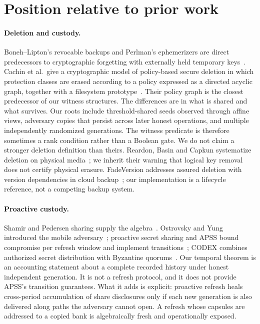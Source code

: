 \documentclass[pdflatex,sn-mathphys-num]{sn-jnl}
\theoremstyle{plain}
\theoremstyle{definition}
\begin{document}
\section{Position relative to prior work}\label{sec:related}

\paragraph{Deletion and custody.}
Boneh--Lipton's revocable backups and Perlman's ephemerizers are direct predecessors to cryptographic forgetting with externally held temporary keys~\cite{boneh1996,perlman2007}. Cachin et al.\ give a cryptographic model of policy-based secure deletion in which protection classes are erased according to a policy expressed as a directed acyclic graph, together with a filesystem prototype~\cite{cachin2013}. Their policy graph is the closest predecessor of our witness structures. The differences are in what is shared and what survives. Our roots include threshold-shared seeds observed through affine views, adversary copies that persist across later honest operations, and multiple independently randomized generations. The witness predicate is therefore sometimes a rank condition rather than a Boolean gate. We do not claim a stronger deletion definition than theirs. Reardon, Basin and Capkun systematize deletion on physical media~\cite{reardon2013}; we inherit their warning that logical key removal does not certify physical erasure. FadeVersion addresses assured deletion with version dependencies in cloud backup~\cite{rahumed2011}; our implementation is a lifecycle reference, not a competing backup system.

\paragraph{Proactive custody.}
Shamir and Pedersen sharing supply the algebra~\cite{shamir1979,pedersen1991}. Ostrovsky and Yung introduced the mobile adversary~\cite{ostrovsky1991}; proactive secret sharing and APSS bound compromise per refresh window and implement transitions~\cite{herzberg1995,zhou2005}; CODEX combines authorized secret distribution with Byzantine quorums~\cite{marsh2004}. Our temporal theorem is an accounting statement about a complete recorded history under honest independent generation. It is not a refresh protocol, and it does not provide APSS's transition guarantees. What it adds is explicit: proactive refresh heals cross-period accumulation of share disclosures only if each new generation is also delivered along paths the adversary cannot open. A refresh whose capsules are addressed to a copied bank is algebraically fresh and operationally exposed.
\end{document}
